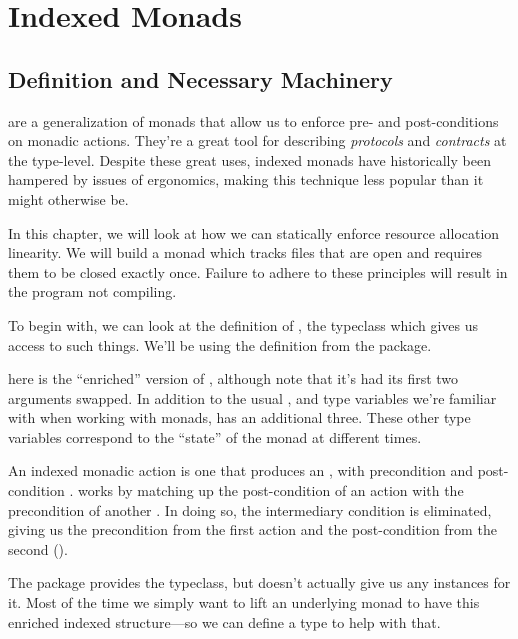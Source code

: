 \documentclass[book.tex]{subfiles}
\begin{document}
\chapter{Indexed Monads}

\section{Definition and Necessary Machinery}


 are a generalization of monads that allow
us to enforce pre- and post-conditions on monadic actions. They're a great tool
for describing \emph{protocols} and \emph{contracts} at the type-level. Despite
these great uses, indexed monads have historically been hampered by issues of
ergonomics, making this technique less popular than it might otherwise be.

In this chapter, we will look at how we can statically enforce resource
allocation linearity. We will build a monad which tracks files that are open and
requires them to be closed exactly once. Failure to adhere to these principles
will result in the program not compiling.

To begin with, we can look at the definition of , the typeclass
which gives us access to such things. We'll be using the definition from the
 \cite{indexed} package.


 here is the ``enriched'' version of \hs{(>>=)}, although note that
it's had its first two arguments swapped. In addition to the usual ,
 and  type variables we're familiar with when working with monads,
 has an additional three. These other type variables correspond to the
``state'' of the monad at different times.

An indexed monadic action  is one that produces an , with
precondition  and post-condition .  works by matching up
the post-condition of an action  with the precondition of another
. In doing so, the intermediary condition  is eliminated, giving
us the precondition from the first action and the post-condition from the second
().

The  package provides the  typeclass, but doesn't
actually give us any instances for it. Most of the time we simply want to lift
an underlying monad to have this enriched indexed structure---so we can define a
type to help with that.
\end{document}
